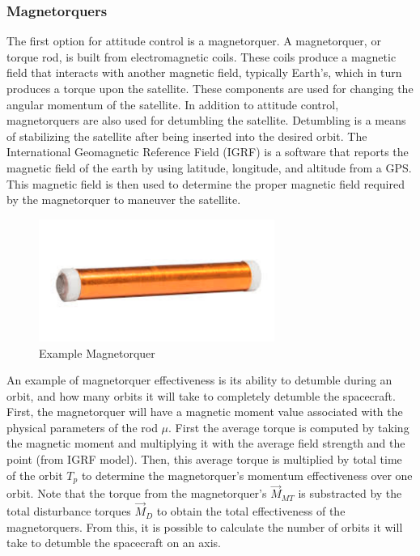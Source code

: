 \documentclass{article}
\begin{document}
\subsubsection{Magnetorquers}

The first option for attitude control is a magnetorquer. A
magnetorquer, or torque rod, is built from electromagnetic
coils. These coils produce a magnetic field that interacts with
another magnetic field, typically Earth’s, which in turn produces a
torque upon the satellite\cite{qp14}. These components are used for changing
the angular momentum of the satellite. In addition to attitude
control, magnetorquers are also used for detumbling the
satellite. Detumbling is a means of stabilizing the satellite after
being inserted into the desired orbit\cite{qp15}. The International
Geomagnetic Reference Field (IGRF) is a software that reports the
magnetic field of the earth by using latitude, longitude, and altitude
from a GPS. This magnetic field is then used to determine the proper
magnetic field required by the magnetorquer to maneuver the
satellite.

\begin{figure}[H]
  \begin{center}
  \includegraphics[height=40mm]{Figures/Magnetorquers}
  \end{center}
  \caption{Example Magnetorquer\cite{qp16}}
\end{figure}

An example of magnetorquer effectiveness is its ability to detumble
during an orbit, and how many orbits it will take to completely
detumble the spacecraft. First, the magnetorquer will have a magnetic
moment value associated with the physical parameters of the rod
$\mu$. First the average torque is computed by taking the magnetic
moment and multiplying it with the average field strength and the
point (from IGRF model). Then, this average torque is multiplied by
total time of the orbit $T_p$ to determine 
the magnetorquer’s momentum effectiveness over one orbit. Note that
the torque from the magnetorquer’s $\vec{M}_{MT}$ is substracted by
the total disturbance torques $\vec{M}_D$ to obtain the total
effectiveness of the magnetorquers. From this, it is possible to
calculate the number of orbits it will take to detumble the spacecraft
on an axis.  
\end{document}
